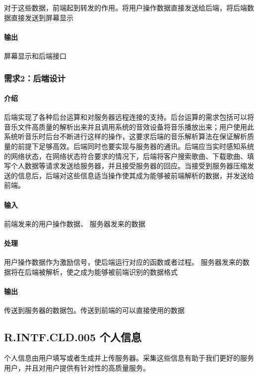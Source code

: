 对于这些数据，前端起到转发的作用。将用户操作数据直接发送给后端，将后端数据直接发送到屏幕显示

\paragraph{输出}

屏幕显示和后端接口


\subsubsection{需求2：后端设计}

\paragraph{介绍}

后端实现了各种后台运算和对服务器远程连接的支持。后台运算的需求包括可以将音乐文件高质量的解析出来并且调用系统的音效设备将音乐播放出来；用户使用此系统听音乐时后台不断进行这样的操作，这要求后端的音乐解析算法在保证解析质量的前提下足够高效。后端同时也要实现与服务器的通讯。后端应当实时感知系统的网络状态，在网络状态符合要求的情况下，后端将客户搜索歌曲、下载歌曲、填写个人数据等请求发送给服务器，并且接受服务器的回应。当接受到服务器压缩发送的信息后，后端对这些信息适当操作使其成为能够被前端解析的数据，并发送给前端。

\paragraph{输入}

前端发来的用户操作数据、
服务器发来的数据

\paragraph{处理}

用户操作数据作为激励信号，使后端运行对应的函数或者过程。
服务器发来的数据将在后端被解析，使之成为能够被前端识别的数据格式

\paragraph{输出}

传送到服务器的数据包。传送到前端的可以直接使用的数据

\subsection{R.INTF.CLD.005 个人信息}
个人信息由用户填写或者生成并上传服务器。采集这些信息有助于我们更好的服务用户，并且对用户提供有针对性的高质量服务。
